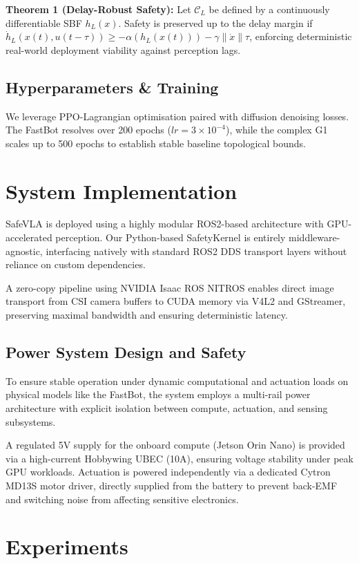 \documentclass[conference]{IEEEtran}
\begin{document}
\textbf{Theorem 1 (Delay-Robust Safety):} Let $\mathcal{C}_L$ be defined by a continuously differentiable SBF $h_L(x)$. Safety is preserved up to the delay margin if $\dot{h}_L(x(t), u(t-\tau)) \geq -\alpha(h_L(x(t))) - \gamma \|\dot{x}\|\tau$, enforcing deterministic real-world deployment viability against perception lags.

\subsection{Hyperparameters \& Training}
We leverage PPO-Lagrangian optimisation paired with diffusion denoising losses. The FastBot resolves over 200 epochs ($lr=3 \times 10^{-4}$), while the complex G1 scales up to 500 epochs to establish stable baseline topological bounds.

\section{System Implementation}

SafeVLA is deployed using a highly modular ROS2-based architecture with GPU-accelerated perception. Our Python-based SafetyKernel is entirely middleware-agnostic, interfacing natively with standard ROS2 DDS transport layers without reliance on custom dependencies. 

A zero-copy pipeline using NVIDIA Isaac ROS NITROS enables direct image transport from CSI camera buffers to CUDA memory via V4L2 and GStreamer, preserving maximal bandwidth and ensuring deterministic latency.

\subsection{Power System Design and Safety}
To ensure stable operation under dynamic computational and actuation loads on physical models like the FastBot, the system employs a multi-rail power architecture with explicit isolation between compute, actuation, and sensing subsystems.

A regulated 5V supply for the onboard compute (Jetson Orin Nano) is provided via a high-current Hobbywing UBEC (10A), ensuring voltage stability under peak GPU workloads. Actuation is powered independently via a dedicated Cytron MD13S motor driver, directly supplied from the battery to prevent back-EMF and switching noise from affecting sensitive electronics.

\section{Experiments}
\end{document}
